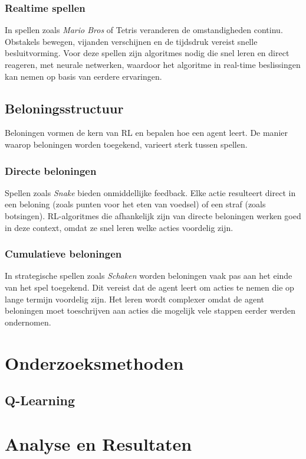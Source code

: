 \documentclass[a4paper,12pt]{report}
\begin{document}
\subsection{Realtime spellen}
In spellen zoals \textit{Mario Bros} of Tetris veranderen de omstandigheden
continu. Obstakels bewegen, vijanden verschijnen en de tijdsdruk vereist snelle
besluitvorming. Voor deze spellen zijn algoritmes nodig die snel leren en
direct reageren, met neurale netwerken, waardoor het algoritme in real-time
beslissingen kan nemen op basis van eerdere ervaringen.

\section{Beloningsstructuur}
Beloningen vormen de kern van RL en bepalen hoe een agent leert. De manier
waarop beloningen worden toegekend, varieert sterk tussen spellen.

\subsection{Directe beloningen}
Spellen zoals \textit{Snake} bieden onmiddellijke feedback. Elke actie
resulteert direct in een beloning (zoals punten voor het eten van voedsel) of
een straf (zoals botsingen). RL-algoritmes die afhankelijk zijn van directe
beloningen werken goed in deze context, omdat ze snel leren welke acties
voordelig zijn.

\subsection{Cumulatieve beloningen}
In strategische spellen zoals \textit{Schaken} worden beloningen vaak pas aan
het einde van het spel toegekend. Dit vereist dat de agent leert om acties te
nemen die op lange termijn voordelig zijn. Het leren wordt complexer omdat de
agent beloningen moet toeschrijven aan acties die mogelijk vele stappen eerder
werden ondernomen.

\chapter{Onderzoeksmethoden}
\section{Q-Learning}

\chapter{Analyse en Resultaten}
\end{document}
